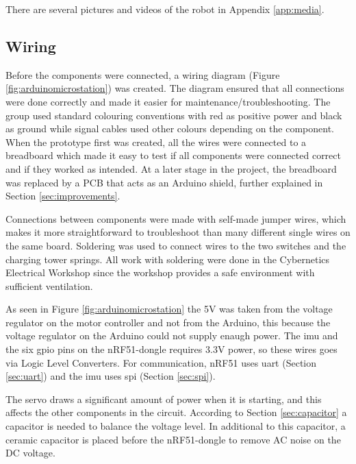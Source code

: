 There are several pictures and videos of the robot in Appendix \ref{app:media}.

\subsection{Wiring}
Before the components were connected, a wiring diagram (Figure \ref{fig:arduinomicrostation}) was created. The diagram ensured that all connections were done correctly and made it easier for maintenance/troubleshooting. The group used standard colouring conventions with red as positive power and black as ground while signal cables used other colours depending on the component. When the prototype first was created, all the wires were connected to a breadboard which made it easy to test if all components were connected correct and if they worked as intended. At a later stage in the project, the breadboard was replaced by a PCB that acts as an Arduino shield, further explained in Section \ref{sec:improvements}.

Connections between components were made with self-made jumper wires, which makes it more straightforward to troubleshoot than many different single wires on the same board. Soldering was used to connect wires to the two switches and the charging tower springs. All work with soldering were done in the Cybernetics Electrical Workshop since the workshop provides a safe environment with sufficient ventilation.

As seen in Figure \ref{fig:arduinomicrostation} the 5V was taken from the voltage regulator on the motor controller and not from the Arduino, this because the voltage regulator on the Arduino could not supply enaugh power. The \acrshort{imu} and the six \acrshort{gpio} pins on the nRF51-dongle requires 3.3V power, so these wires goes via Logic Level Converters. For communication, nRF51 uses \acrshort{uart} (Section \ref{sec:uart}) and the \acrshort{imu} uses \acrshort{spi} (Section \ref{sec:spi}).

The servo draws a significant amount of power when it is starting, and this affects the other components in the circuit. According to Section \ref{sec:capacitor} a capacitor is needed to balance the voltage level. In additional to this capacitor, a ceramic capacitor is placed before the nRF51-dongle to remove AC noise on the DC voltage.